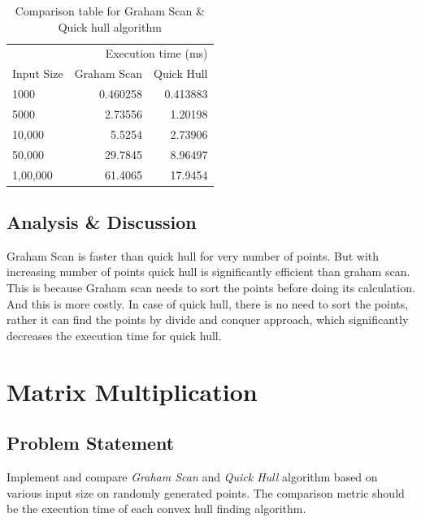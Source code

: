 \begin{table}[H]
    \centering
    \caption {Comparison table for Graham Scan \& Quick hull algorithm}
    \label{tab:comp}
\begin{tabular}{lrr}
    \toprule
    \multicolumn{3}{r}{Execution time (ms)} \\
    \cmidrule(c){2-3}
    Input Size & Graham Scan & Quick Hull\\ 
    \midrule
    1000 & 0.460258 & 0.413883\\
    5000 & 2.73556 & 1.20198\\
    10,000 & 5.5254 & 2.73906 \\
    50,000 & 29.7845 & 8.96497 \\
    1,00,000 & 61.4065  & 17.9454 \\
    \bottomrule
\end{tabular}
\end{table}
\subsection{Analysis \& Discussion}
Graham Scan is faster than quick hull for very number of points. 
But with increasing number of points quick hull is significantly efficient
than graham scan. 
This is because Graham scan needs to sort the points before doing its
calculation. And this is more costly. 
In case of quick hull, there is no need to sort the points, rather it can find 
the points by divide and conquer approach, which significantly decreases 
the execution time for quick hull.

\newpage
\section{Matrix Multiplication}
\subsection{Problem Statement}
Implement and compare \textit{Graham Scan} and \textit{Quick Hull} algorithm based on
various input size on randomly generated points.
The comparison metric should be the execution time of each convex hull
finding algorithm.
